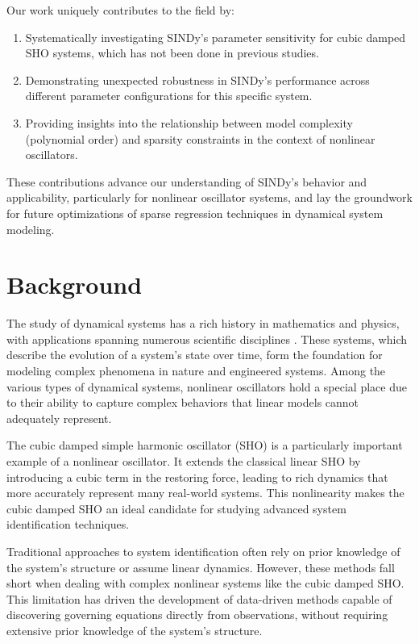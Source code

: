 \documentclass{article} %
\begin{document}
Our work uniquely contributes to the field by:
\begin{enumerate}
    \item Systematically investigating SINDy's parameter sensitivity for cubic damped SHO systems, which has not been done in previous studies.
    \item Demonstrating unexpected robustness in SINDy's performance across different parameter configurations for this specific system.
    \item Providing insights into the relationship between model complexity (polynomial order) and sparsity constraints in the context of nonlinear oscillators.
\end{enumerate}

These contributions advance our understanding of SINDy's behavior and applicability, particularly for nonlinear oscillator systems, and lay the groundwork for future optimizations of sparse regression techniques in dynamical system modeling.

\section{Background}
\label{sec:background}

The study of dynamical systems has a rich history in mathematics and physics, with applications spanning numerous scientific disciplines \citep{goodfellow2016deep}. These systems, which describe the evolution of a system's state over time, form the foundation for modeling complex phenomena in nature and engineered systems. Among the various types of dynamical systems, nonlinear oscillators hold a special place due to their ability to capture complex behaviors that linear models cannot adequately represent.

The cubic damped simple harmonic oscillator (SHO) is a particularly important example of a nonlinear oscillator. It extends the classical linear SHO by introducing a cubic term in the restoring force, leading to rich dynamics that more accurately represent many real-world systems. This nonlinearity makes the cubic damped SHO an ideal candidate for studying advanced system identification techniques.

Traditional approaches to system identification often rely on prior knowledge of the system's structure or assume linear dynamics. However, these methods fall short when dealing with complex nonlinear systems like the cubic damped SHO. This limitation has driven the development of data-driven methods capable of discovering governing equations directly from observations, without requiring extensive prior knowledge of the system's structure.
\end{document}
